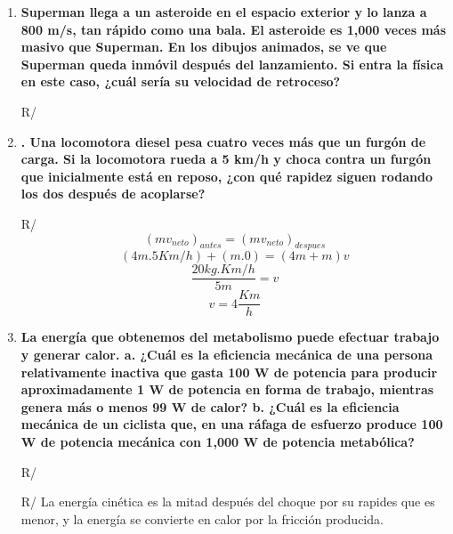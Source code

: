 \documentclass[a4paper]{article}
\begin{document}
\begin{enumerate}
		\item\textbf{Superman llega a un asteroide en el espacio exterior y lo lanza a 800 m/s, tan rápido como una 
			bala. El asteroide es 1,000 veces más masivo que Superman. En los dibujos animados, se ve que 
			Superman queda inmóvil después del lanzamiento. Si entra la física en este caso, ¿cuál sería su 
			velocidad de retroceso?}
		
		R/ 
		
		
		\item\textbf{. Una locomotora diesel pesa cuatro veces más que un furgón de carga. Si la locomotora rueda a 5 
			km/h y choca contra un furgón que inicialmente está en reposo, ¿con qué rapidez siguen rodando 
			los dos después de acoplarse?}
		
		R/$$(mv_{neto})_{antes}=(mv_{neto})_{despues}$$
		$$(4m.5Km/h)+(m.0)=(4m+m)v$$
		$$\frac{20kg.Km/h}{5m}=v$$
		$$v=4\frac{Km}{h}$$
		
		\item\textbf{La energía que obtenemos del metabolismo puede efectuar trabajo y generar calor. 
			a. ¿Cuál es la eficiencia mecánica de una persona relativamente inactiva que gasta 100 W 
			de potencia para producir aproximadamente 1 W de potencia en forma de trabajo, 
			mientras genera más o menos 99 W de calor? 
			b. ¿Cuál es la eficiencia mecánica de un ciclista que, en una ráfaga de esfuerzo produce 100 
			W de potencia mecánica con 1,000 W de potencia metabólica?}
		
		R/ 
		
		
		
		R/ La energía cinética es la mitad después del choque por su rapides que es menor, y la energía se convierte en calor por la fricción producida.
		
		
		
	\end{enumerate}
	
	
\end{document}
